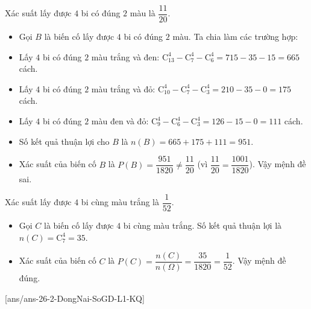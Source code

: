 \begin{ex}[]
{\begin{itemchoice}
			\itemch Xác suất lấy được $4$ bi có đúng $2$ màu là $\dfrac{11}{20}$.
			\begin{itemize}
				\item Gọi $B$ là biến cố lấy được $4$ bi có đúng $2$ màu. Ta chia làm các trường hợp:
				\item Lấy $4$ bi có đúng $2$ màu trắng và đen: $\mathrm{C}_{13}^4 - \mathrm{C}_{7}^4 - \mathrm{C}_{6}^4 = 715 - 35 - 15 = 665$ cách.
				\item Lấy $4$ bi có đúng $2$ màu trắng và đỏ: $\mathrm{C}_{10}^4 - \mathrm{C}_{7}^4 - \mathrm{C}_{3}^4 = 210 - 35 - 0 = 175$ cách.
				\item Lấy $4$ bi có đúng $2$ màu đen và đỏ: $\mathrm{C}_{9}^4 - \mathrm{C}_{6}^4 - \mathrm{C}_{3}^4 = 126 - 15 - 0 = 111$ cách.
				\item Số kết quả thuận lợi cho $B$ là $n(B) = 665 + 175 + 111 = 951$.
				\item Xác suất của biến cố $B$ là $P(B) = \dfrac{951}{1820} \neq \dfrac{11}{20}$ (vì $\dfrac{11}{20} = \dfrac{1001}{1820}$). Vậy mệnh đề sai.
			\end{itemize}
			
			\itemch Xác suất lấy được $4$ bi cùng màu trắng là $\dfrac{1}{52}$.
			\begin{itemize}
				\item Gọi $C$ là biến cố lấy được $4$ bi cùng màu trắng. Số kết quả thuận lợi là $n(C) = \mathrm{C}_7^4 = 35$.
				\item Xác suất của biến cố $C$ là $P(C) = \dfrac{n(C)}{n(\Omega)} = \dfrac{35}{1820} = \dfrac{1}{52}$. Vậy mệnh đề đúng.
			\end{itemize}
		\end{itemchoice}
	}
\end{ex}

[ans/ans-26-2-DongNai-SoGD-L1-KQ]
\caukq

